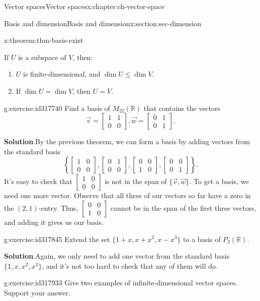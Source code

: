 \documentclass[oneside,10pt,]{book}
\numberwithin{equation}{section}
\newcommand{\bbm}{\begin{bmatrix}}
\newcommand{\ebm}{\end{bmatrix}}
\newcommand{\R}{\mathbb{R}}
\newcommand{\amp}{&}
\begin{document}
\begin{chapterptx}{Vector spaces}{}{Vector spaces}{}{}{x:chapter:ch-vector-space}
\begin{sectionptx}{Basis and dimension}{}{Basis and dimension}{}{}{x:section:sec-dimension}
\begin{theorem}{}{}{x:theorem:thm-basis-exist}
\begin{enumerate}
\end{enumerate}
%
\par
If \(U\) is a subspace of \(V\), then:%
\begin{enumerate}
\item{}\(U\) is finite-dimensional, and \(\dim U\leq \dim V\).%
\item{}If \(\dim U = \dim V\), then \(U=V\).%
\end{enumerate}
%
\end{theorem}
\begin{inlineexercise}{}{g:exercise:id317740}%
Find a basis of \(M_{22}(\R)\) that contains the vectors%
\begin{equation*}
\vec{v}=\bbm 1\amp 1\\0\amp 0\ebm, \vec{w}=\bbm 0\amp 1\\0\amp 1\ebm\text{.}
\end{equation*}
%
\par\smallskip%
\noindent\textbf{Solution}.\hypertarget{g:solution:id317786}{}\quad{}By the previous theorem, we can form a basis by adding vectors from the standard basis%
\begin{equation*}
\left\{\bbm 1\amp 0\\0\amp 0\ebm, \bbm 0\amp 1\\0\amp 0\ebm, \bbm 0\amp 0\\1\amp 0\ebm, \bbm 0\amp 0\\0\amp 1\ebm\right\}\text{.}
\end{equation*}
It's easy to check that \(\bbm 1\amp 0\\0\amp 0\ebm\) is not in the span of \(\{\vec{v},\vec{w}\}\). To get a basis, we need one more vector. Observe that all three of our vectors so far have a zero in the \((2,1)\)-entry. Thus, \(\bbm 0\amp 0\\1\amp 0\ebm\) cannot be in the span of the first three vectors, and adding it gives us our basis.%
\end{inlineexercise}
\begin{inlineexercise}{}{g:exercise:id317845}%
Extend the set \(\{1+x,x+x^2,x-x^3\}\) to a basis of \(P_3(\R)\).%
\par\smallskip%
\noindent\textbf{Solution}.\hypertarget{g:solution:id317898}{}\quad{}Again, we only need to add one vector from the standard basis \(\{1,x,x^2,x^3\}\), and it's not too hard to check that any of them will do.%
\end{inlineexercise}
\begin{inlineexercise}{}{g:exercise:id317933}%
Give two examples of infinite-dimensional vector spaces. Support your answer.%

\end{inlineexercise}
\end{sectionptx}
\end{chapterptx}
\end{document}

